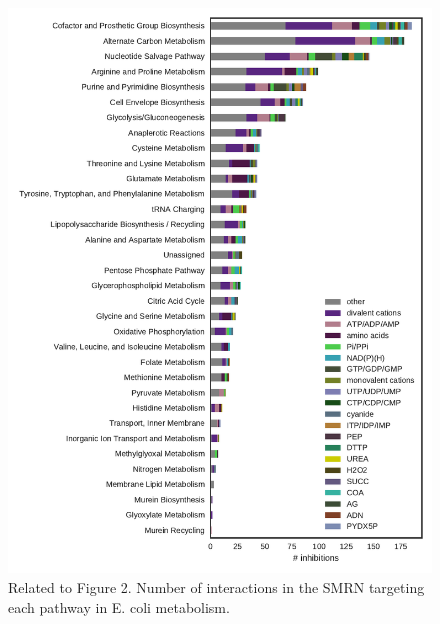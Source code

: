 \documentclass[12pt,a4paper]{article}
\begin{document}
\begin{figure}[ht!]
	\includegraphics[width=\textwidth]{../manuscript/figS3.pdf}
	\caption{Related to Figure 2. Number of interactions in the SMRN targeting each pathway in E. coli metabolism. 
	}
\end{figure}
\end{document}

